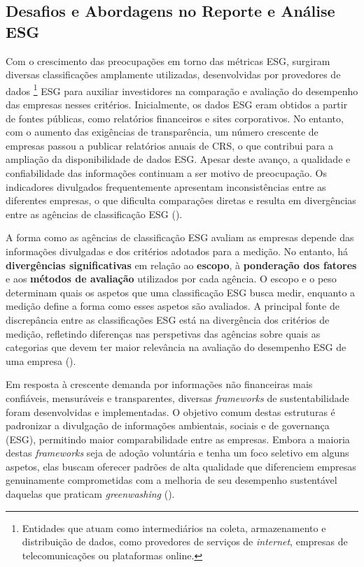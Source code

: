 
\subsection{Desafios e Abordagens no Reporte e Análise ESG}
\label{subsec: MARAESG}

Com o crescimento das preocupações em torno das métricas \gls{ESG}, surgiram diversas classificações amplamente utilizadas, desenvolvidas por provedores de dados \footnote{Entidades que atuam como intermediários na coleta, armazenamento e distribuição de dados, como provedores de serviços de \textit{internet}, empresas de telecomunicações ou plataformas online.} ESG para auxiliar investidores na comparação e avaliação do desempenho das empresas nesses critérios. Inicialmente, os dados ESG eram obtidos a partir de fontes públicas, como relatórios financeiros e sites corporativos. No entanto, com o aumento das exigências de transparência, um número crescente de empresas passou a publicar relatórios anuais de \gls{CRS}, o que contribui para a ampliação da disponibilidade de dados ESG. Apesar deste avanço, a qualidade e confiabilidade das informações continuam a ser motivo de preocupação. Os indicadores divulgados frequentemente apresentam inconsistências entre as diferentes empresas, o que dificulta comparações diretas e resulta em divergências entre as agências de classificação ESG (\cite{Rau2024}).

A forma como as agências de classificação ESG avaliam as empresas depende das informações divulgadas e dos critérios adotados para a medição. No entanto, há \textbf{divergências significativas} em relação ao \textbf{escopo}, à \textbf{ponderação dos fatores} e aos \textbf{métodos de avaliação} utilizados por cada agência. O escopo e o peso determinam quais os aspetos que uma classificação ESG busca medir, enquanto a medição define a forma como esses aspetos são avaliados. A principal fonte de discrepância entre as classificações ESG está na divergência dos critérios de medição, refletindo diferenças nas perspetivas das agências sobre quais as categorias que devem ter maior relevância na avaliação do desempenho ESG de uma empresa (\cite{Berg2022}).

Em resposta à crescente demanda por informações não financeiras mais confiáveis, mensuráveis e transparentes, diversas \textit{frameworks} de sustentabilidade foram desenvolvidas e implementadas. O objetivo comum destas estruturas é padronizar a divulgação de informações ambientais, sociais e de governança (ESG), permitindo maior comparabilidade entre as empresas. Embora a maioria destas \textit{frameworks} seja de adoção voluntária e tenha um foco seletivo em alguns aspetos, elas buscam oferecer padrões de alta qualidade que diferenciem empresas genuinamente comprometidas com a melhoria de seu desempenho sustentável daquelas que praticam \textit{greenwashing} (\cite{Cruz2023}).

